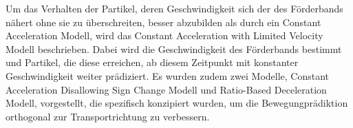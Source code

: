 Um das Verhalten der Partikel, deren Geschwindigkeit sich der des Förderbands nähert ohne sie zu überschreiten, besser abzubilden als durch ein Constant Acceleration Modell,
wird das Constant Acceleration with Limited Velocity Modell beschrieben. 
Dabei wird die Geschwindigkeit des Förderbands bestimmt und Partikel, die diese erreichen, ab diesem Zeitpunkt mit konstanter Geschwindigkeit weiter prädiziert.
Es wurden zudem zwei Modelle, Constant Acceleration Disallowing Sign Change Modell und Ratio-Based Deceleration Modell, vorgestellt, 
die spezifisch konzipiert wurden, um die Bewegungprädiktion orthogonal zur Transportrichtung zu verbessern.


